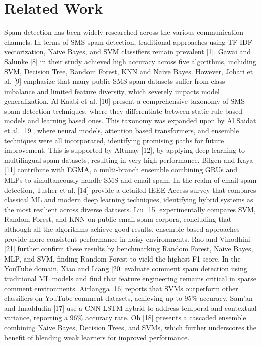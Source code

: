 \documentclass{article}
\begin{document}
\section{Related Work}
Spam detection has been widely researched across the various communication channels. In terms of SMS spam detection, traditional approaches using TF-IDF vectorization, Naive Bayes, and SVM classifiers remain prevalent [1]. Gawai and Salunke [8] in their study achieved high accuracy across five algorithms, including SVM, Decision Tree, Random Forest, KNN and Naive Bayes. However, Johari et al. [9] emphasize that many public SMS spam datasets suffer from class imbalance and limited feature diversity, which severely impacts model generalization.
\newline
\newline
Al-Kaabi et al. [10] present a comprehensive taxonomy of SMS spam detection techniques, where they differentiate between static rule based models and learning based ones. This taxonomy was expanded upon by Al Saidat et al. [19], where neural models, attention based transformers, and ensemble techniques were all incorporated, identifying promising paths for future improvement. This is supported by Altunay [12], by applying deep learning to multilingual spam datasets, resulting in very high performance. Bilgen and Kaya [11] contribute with EGMA, a multi-branch ensemble combining GRUs and MLPs to simultaneously handle SMS and email spam.
\newline
\newline
In the realm of email spam detection, Tusher et al. [14] provide a detailed IEEE Access survey that compares classical ML and modern deep learning techniques, identifying hybrid systems as the most resilient across diverse datasets. Liu [15] experimentally compares SVM, Random Forest, and KNN on public email spam corpora, concluding that although all the algorithms achieve good results, ensemble based approaches provide more consistent performance in noisy environments. Rao and Vinodhini [21] further confirm these results by benchmarking Random Forest, Naive Bayes, MLP, and SVM, finding Random Forest to yield the highest F1 score.
\newline
\newline
In the YouTube domain, Xiao and Liang [20] evaluate comment spam detection using traditional ML models and find that feature engineering remains critical in sparse comment environments. Airlangga [16] reports that SVMs outperform other classifiers on YouTube comment datasets, achieving up to 95\% accuracy. Sam’an and Imaddudin [17] use a CNN-LSTM hybrid to address temporal and contextual variance, reporting a 96\% accuracy rate. Oh [18] presents a cascaded ensemble combining Naive Bayes, Decision Trees, and SVMs, which further underscores the benefit of blending weak learners for improved performance.
\end{document}
